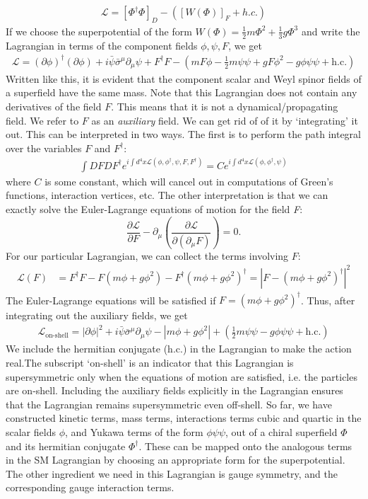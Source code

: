 \begin{align*}
  \mathcal{L} = [\Phi^\dagger\Phi]_D - \left([W(\Phi)]_F + h.c.\right)
\end{align*}
If we choose the superpotential of the form $W(\Phi) = \frac{1}{2}m\Phi^2 + \frac{1}{3}g\Phi^3$ and write the Lagrangian in terms of the component fields $\phi,\psi,F$, we get
\begin{align*}
  \mathcal{L} = (\partial\phi)^\dagger(\partial\phi) + i\bar{\psi}\bar{\sigma}^\mu\partial_\mu\psi+F^\dagger F-\left(mF\phi-\frac{1}{2}m\psi\psi+gF\phi^2-g\phi\psi\psi + \text{h.c.}\right)
\end{align*}
Written like this, it is evident that the component scalar and Weyl spinor fields of a superfield have the same mass. Note that this Lagrangian does not contain any derivatives of the field $F$. This means that it is not a dynamical/propagating field. We refer to $F$ as an \emph{auxiliary} field. We can get rid of of it by `integrating' it out. This can be interpreted in two ways. The first is to perform the path integral over the variables $F$ and $F^\dagger$:
\begin{align*}
\int DFDF^\dagger e^{i\int d^4x \mathcal{L}(\phi,\phi^\dagger,\psi,F,F^\dagger)} = 
 C e^{i\int d^4x \mathcal{L}(\phi,\phi^\dagger,\psi)}
\end{align*}
where $C$ is some constant, which will cancel out in computations of Green's functions, interaction vertices, etc. The other interpretation is that we can exactly solve the Euler-Lagrange equations of motion for the field \emph{F}:
\[\frac{\partial\mathcal{L}}{\partial F}-\partial_\mu\left(\frac{\partial\mathcal{L}}{\partial(\partial_\mu F)}\right) = 0.\]
For our particular Lagrangian, we can collect the terms involving $F$:
\begin{align*}
\mathcal{L}(F) &= F^\dagger F - F(m\phi+g\phi^2) - F^\dagger(m\phi+g\phi^2)^\dagger= |F-(m\phi+g\phi^2)^\dagger|^2
\end{align*}
The Euler-Lagrange equations will be satisfied if $F = (m\phi+g\phi^2)^\dagger$. Thus, after integrating out the auxiliary fields, we get
\begin{align*}
  \mathcal{L}_\text{on-shell} = |\partial\phi|^2+ i\bar{\psi}\bar{\sigma}^\mu\partial_\mu\psi-|m\phi+g\phi^2|+\left(\frac{1}{2}m\psi\psi-g\phi\psi\psi + \text{h.c.}\right)
\end{align*}
We include the hermitian conjugate (h.c.) in the Lagrangian to make the action real.The subscript `on-shell' is an indicator that this Lagrangian is supersymmetric only when the equations of motion are satisfied, i.e. the particles are on-shell. Including the auxiliary fields explicitly in the Lagrangian ensures that the Lagrangian remains supersymmetric even off-shell. So far, we have constructed kinetic terms, mass terms, interactions terms cubic and quartic in the scalar fields $\phi$, and Yukawa terms of the form $\phi\psi\psi$, out of a chiral superfield $\Phi$ and its hermitian conjugate $\Phi^\dagger$. These can be mapped onto the analogous terms in the SM Lagrangian by choosing an appropriate form for the superpotential. The other ingredient we need in this Lagrangian is gauge symmetry, and the corresponding gauge interaction terms.
